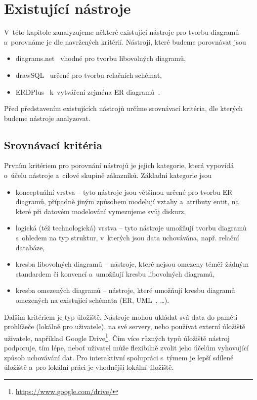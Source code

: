 \chapter{Existující nástroje}

V~této kapitole zanalyzujeme některé existující nástroje pro tvorbu diagramů
a~porovnáme je dle navržených kritérií. Nástroji, které budeme porovnávat jsou
\begin{itemize}
  \item diagrams.net~\cite{diagramsnet21} vhodné pro tvorbu libovolných diagramů,
  \item drawSQL~\cite{drawsql21} určené pro tvorbu relačních schémat,
  \item ERDPlus~\cite{erdplus21} k~vytváření zejména ER diagramů~\cite{Chen76}.
\end{itemize}

Před představením existujících nástrojů určíme srovnávací kritéria, dle kterých
budeme nástroje analyzovat.

\section{Srovnávací kritéria}

Prvním kritériem pro porovnání nástrojů je jejich kategorie, která vypovídá
o~účelu nástroje a~cílové skupině zákazníků. Základní kategorie jsou
\begin{itemize}
  \item konceptuální vrstva -- tyto nástroje jsou většinou určené pro tvorbu ER
  diagramů, případně jiným způsobem modelují vztahy a~atributy entit, na které
  při datovém modelování vymezujeme svůj diskurz,
  \item logická (též technologická) vrstva -- tyto nástroje umožňují tvorbu
  diagramů s~ohledem na typ struktur, v~kterých jsou data uchovávána, např.
  relační databáze,
  \item kresba libovolných diagramů -- nástroje, které nejsou omezeny téměř
  žádným standardem či konvencí a~umožňují kresbu libovolných diagramů,
  \item kresba omezených diagramů -- nástroje, které umožňují kresbu diagramů
  omezených na existující schémata (ER, UML~\cite{uml2017}, \dots).
\end{itemize}

Dalším kritériem je typ úložiště. Nástroje mohou ukládat svá data do paměti
prohlížeče (lokálně pro uživatele), na své servery, nebo používat externí
úložiště uživatele, například Google
Drive\footnote{\url{https://www.google.com/drive/}}. Čím více různých typů
úložiště nástroj podporuje, tím lépe, neboť uživatel může flexibilně zvolit jeho
účelům vyhovující způsob uchovávání dat. Pro interaktivní spolupráci s~týmem je
lepší sdílené úložiště a~pro lokální práci je vhodnější lokální úložiště.

